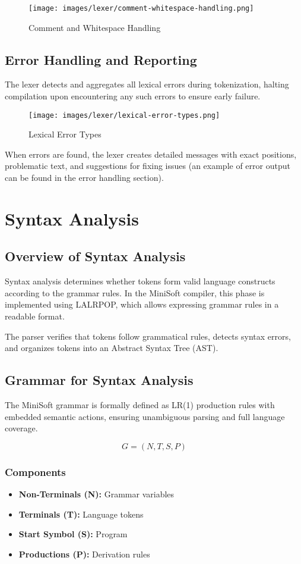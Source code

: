 \documentclass[12pt,a4paper]{article}
\begin{document}
\begin{figure}[H]
	\centering
	\texttt{[image: images/lexer/comment-whitespace-handling.png]}
	\caption{Comment and Whitespace Handling}
\end{figure}

\subsection{Error Handling and Reporting}
The lexer detects and aggregates all lexical errors during tokenization, halting compilation upon encountering any such errors to ensure early failure.

\begin{figure}[H]
	\centering
	\texttt{[image: images/lexer/lexical-error-types.png]}
	\caption{Lexical Error Types}
\end{figure}

When errors are found, the lexer creates detailed messages with exact positions, problematic text, and suggestions for fixing issues (an example of error output can be found in the error handling section).

\section{Syntax Analysis}
\subsection{Overview of Syntax Analysis}
Syntax analysis determines whether tokens form valid language constructs according to the grammar rules. In the MiniSoft compiler, this phase is implemented using LALRPOP, which allows expressing grammar rules in a readable format.

The parser verifies that tokens follow grammatical rules, detects syntax errors, and organizes tokens into an Abstract Syntax Tree (AST).


\subsection{Grammar for Syntax Analysis}
The MiniSoft grammar is formally defined as LR(1) production rules with embedded semantic actions, ensuring unambiguous parsing and full language coverage.

\[
	G = (N, T, S, P)
\]

\subsubsection*{Components}
\begin{itemize}
	\item \textbf{Non-Terminals (N):} Grammar variables
	\item \textbf{Terminals (T):} Language tokens
	\item \textbf{Start Symbol (S):} Program
	\item \textbf{Productions (P):} Derivation rules
\end{itemize}
\end{document}
